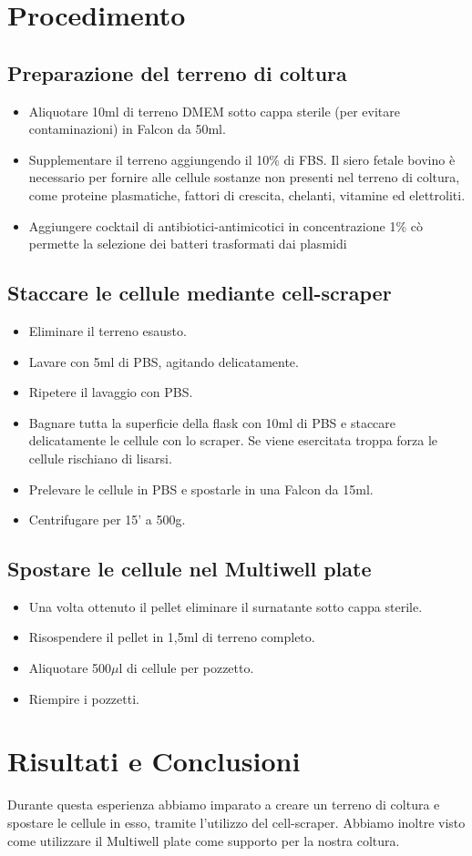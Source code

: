 \section{Procedimento}

\subsection{Preparazione del terreno di coltura}

\begin{itemize}
	\item Aliquotare 10ml di terreno DMEM sotto cappa sterile
	(per evitare contaminazioni) in Falcon da 50ml.
	\item Supplementare il terreno aggiungendo il 10\% di FBS.
	Il siero fetale bovino \`e necessario per fornire alle cellule sostanze non
	presenti nel terreno di coltura, come proteine plasmatiche,
	fattori di crescita, chelanti, vitamine ed elettroliti.
	\item Aggiungere cocktail di antibiotici-antimicotici in concentrazione 1\%
	c\`o permette la selezione dei batteri trasformati dai plasmidi
\end{itemize}

\subsection{Staccare le cellule mediante cell-scraper}
\begin{itemize}
	\item Eliminare il terreno esausto.
	\item Lavare con 5ml di PBS, agitando delicatamente.
	\item Ripetere il lavaggio con PBS.
	\item Bagnare tutta la superficie della flask con 10ml di PBS e staccare
	delicatamente le cellule con lo scraper. Se viene esercitata troppa forza le
	cellule rischiano di lisarsi.
	\item Prelevare le cellule in PBS e spostarle in una Falcon da 15ml.
	\item Centrifugare per 15' a 500g.
\end{itemize}

\subsection{Spostare le cellule nel Multiwell plate}
\begin{itemize}
	\item Una volta ottenuto il pellet eliminare il surnatante sotto cappa sterile.
	\item Risospendere il pellet in 1,5ml di terreno completo.
	\item Aliquotare 500$\mu$l di cellule per pozzetto.
	\item Riempire i pozzetti.
\end{itemize}

\section{Risultati e Conclusioni}

Durante questa esperienza abbiamo imparato a creare un terreno di coltura
e spostare le cellule in esso, tramite l'utilizzo del cell-scraper.
Abbiamo inoltre visto come utilizzare il Multiwell plate come supporto per la
nostra coltura.
